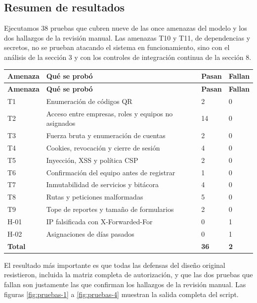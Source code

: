 \documentclass[12pt, letterpaper]{article}
\begin{document}
\subsection{Resumen de resultados}

Ejecutamos 38 pruebas que cubren nueve de las once amenazas del modelo y los dos hallazgos de la revisión manual. Las amenazas T10 y T11, de dependencias y secretos, no se prueban atacando el sistema en funcionamiento, sino con el análisis de la sección 3 y con los controles de integración continua de la sección 8.

\begingroup\small\setlength{\tabcolsep}{4pt}\renewcommand{\arraystretch}{1.25}
\begin{longtable}{L{0.14}L{0.52}L{0.12}L{0.12}}
\toprule
\textbf{Amenaza} & \textbf{Qué se probó} & \textbf{Pasan} & \textbf{Fallan} \\
\midrule
\endfirsthead
\toprule
\textbf{Amenaza} & \textbf{Qué se probó} & \textbf{Pasan} & \textbf{Fallan} \\
\midrule
\endhead
\bottomrule
\endfoot
T1 & Enumeración de códigos QR & 2 & 0 \\
T2 & Acceso entre empresas, roles y equipos no asignados & 14 & 0 \\
T3 & Fuerza bruta y enumeración de cuentas & 2 & 0 \\
T4 & Cookies, revocación y cierre de sesión & 4 & 0 \\
T5 & Inyección, XSS y política CSP & 2 & 0 \\
T6 & Confirmación del equipo antes de registrar & 1 & 0 \\
T7 & Inmutabilidad de servicios y bitácora & 4 & 0 \\
T8 & Rutas y peticiones malformadas & 5 & 0 \\
T9 & Tope de reportes y tamaño de formularios & 2 & 0 \\
H-01 & IP falsificada con X-Forwarded-For & 0 & 1 \\
H-02 & Asignaciones de días pasados & 0 & 1 \\
\midrule
\textbf{Total} & & \textbf{36} & \textbf{2} \\
\end{longtable}
\endgroup

El resultado más importante es que todas las defensas del diseño original resistieron, incluida la matriz completa de autorización, y que las dos pruebas que fallan son justamente las que confirman los hallazgos de la revisión manual. Las figuras \ref{fig:pruebas-1} a \ref{fig:pruebas-4} muestran la salida completa del script.
\end{document}

